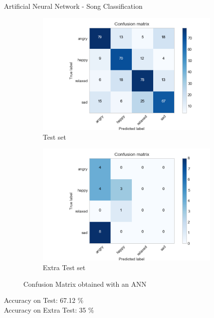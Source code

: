 \documentclass[xcolor=dvipsnames]{beamer}
\begin{document}
\begin{frame}{Artificial Neural Network - Song Classification} 

\begin{figure}[h!]
  \centering
  \begin{subfigure}[b]{0.45\linewidth}
    \includegraphics[width=\linewidth]{./images/CM_ANN.png}
    \caption{Test set}
  \end{subfigure}
  \begin{subfigure}[b]{0.45\linewidth}
    \includegraphics[width=\linewidth]{./images/CM_ANN_extra_test.png}
    \caption{Extra Test set}
  \end{subfigure}
  \caption{Confusion Matrix obtained with an ANN}
\end{figure}
Accuracy on Test: 67.12 \% \\
Accuracy on Extra Test: 35 \%
\end{frame}
\end{document}
